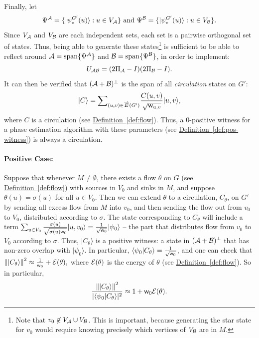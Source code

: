 \documentclass{article}
\newcommand{\defin}[1]{\hyperref[def:#1]{Definition~\ref*{def:#1}}}
\def\ket#1{{\lvert}#1\rangle}
\renewcommand{\>}{\rangle}
\newcommand{\<}{\langle}
\renewcommand{\(}{\left(}
\renewcommand{\)}{\right)}
\def\braket#1#2{{{\langle}#1\vert}#2\rangle}
\def\norm#1{\left\| #1 \right\|}
\def\w{{\sf w}}
\begin{document}
Finally, let 
$$\Psi^{\cal A}=\{\ket{\psi_\star^{G'}(u)}:u\in V_{\cal A}\}
\mbox{ and }
\Psi^{\cal B}=\{\ket{\psi_\star^{G'}(u)}:u\in V_{\cal B}\}.$$
Since $V_{\cal A}$ and $V_{\cal B}$ are each independent sets, each set is a pairwise orthogonal set of states. Thus, being able to generate these states\footnote{Note that $v_0\not\in V_{\cal A}\cup V_{\cal B}$. This is important, because generating the star state for $v_0$ would require knowing precisely which vertices of $V_{\cal B}$ are in $M$.} is sufficient to be able to reflect around ${\cal A}=\mathrm{span}\{\Psi^{\cal A}\}$ and ${\cal B}=\mathrm{span}\{\Psi^{\cal B}\}$, in order to implement:
$$U_{\cal AB}=(2\Pi_{\cal A}-I)(2\Pi_{\cal B}-I).$$
It can then be verified that $({\cal A}+{\cal B})^\bot$ is the span of all \emph{circulation} states on $G'$:
$$\ket{C}=\textstyle{\displaystyle\sum}_{(u,v)\in \overrightarrow{E}(G')}\displaystyle\frac{C(u,v)}{\sqrt{\w_{u,v}}}\ket{u,v},$$
where $C$ is a circulation (see \defin{flow}). Thus, a 0-positive witness for a phase estimation algorithm with these parameters (see \defin{pos-witness}) is always a circulation. 

\paragraph{Positive Case:} Suppose that whenever $M\neq\emptyset$, there exists a flow $\theta$ on $G$ (see \defin{flow}) with sources in $V_0$ and sinks in $M$, and suppose $\theta(u)=\sigma(u)$ for all $u\in V_0$. Then we can extend $\theta$ to a circulation, $C_\theta$, on $G'$ by sending all excess flow from $M$ into $v_0$, and then sending the flow out from $v_0$ to $V_0$, distributed according to $\sigma$. The state corresponding to $C_\theta$ will include a term $\sum_{u\in V_0}\frac{\sigma(u)}{\sqrt{\sigma(u) \w_0}}\ket{u,v_0}=\frac{1}{\sqrt{\w_0}}\ket{\psi_0}$ -- the part that distributes flow from $v_0$ to $V_0$ according to $\sigma$. Thus, $\ket{C_\theta}$ is a positive witness: a state in $({\cal A}+{\cal B})^\bot$ that has non-zero overlap with $\ket{\psi_0}$. In particular, $\braket{\psi_0}{C_\theta}=\frac{1}{\sqrt{\w_0}}$, and one can check that 
$\norm{\ket{C_\theta}}^2 \approx \frac{1}{\w_0}+{\cal E}(\theta),$
where ${\cal E}(\theta)$ is the energy of $\theta$ (see \defin{flow}). So in particular, 
$$\frac{\norm{\ket{C_\theta}}^2}{|\braket{\psi_0}{C_\theta}|^2} \approx 1+\w_0 {\cal E}(\theta).$$
\end{document}
